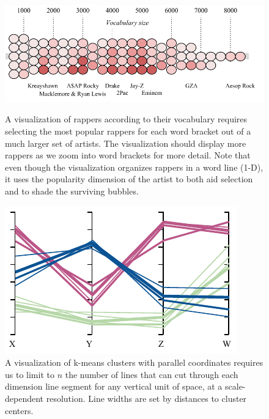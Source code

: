 \documentclass[11pt, oneside]{report}
\begin{document}
{\begin{figure}[!t]
     \begin{minipage}{0.62\linewidth}
        \centerline{\includegraphics[width=0.99\linewidth]{figs-glossy/rappers_viz.pdf}}
        \vspace{-1ex}
        \caption{A visualization of rappers according to their vocabulary requires selecting the most popular rappers for each word bracket out of a much larger set of artists. The visualization should display more rappers as we zoom into word brackets for more detail. Note that even though the visualization organizes rappers in a word line (1-D), it uses the popularity dimension of the artist to both aid selection and to shade the surviving bubbles.}\label{fig:example:rappers}
    \end{minipage} \hfill
       \begin{minipage}{0.36\linewidth}
        \centerline{\includegraphics[width=0.99\linewidth]{figs-glossy/parallel_coordinates.pdf}}
        \vspace{-1ex}
        \caption{A visualization of k-means clusters with parallel coordinates requires us to limit to $n$ the number of lines that can cut through each dimension line segment for any vertical unit of space, at a scale-dependent resolution. Line widths are set by distances to cluster centers.} \label{fig:example:clusters}

\end{minipage}
\end{figure}}
\end{document}
